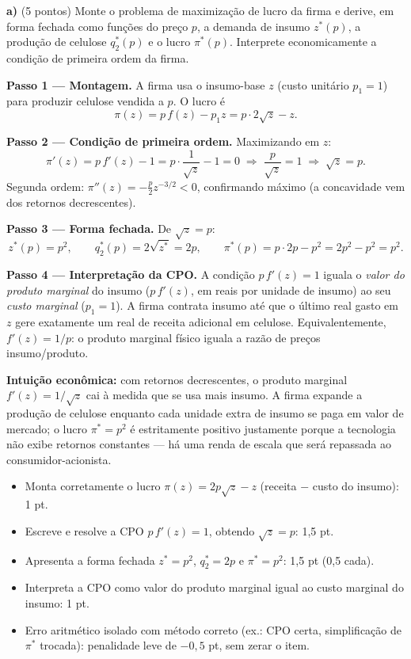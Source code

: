 \textbf{a)} (5 pontos) Monte o problema de maximização de lucro da firma e derive, em forma fechada como funções do preço $p$, a demanda de insumo $z^{*}(p)$, a produção de celulose $q_2^{*}(p)$ e o lucro $\pi^{*}(p)$. Interprete economicamente a condição de primeira ordem da firma.
\resolucaobox{7.2cm}
\begin{solucao}
\textbf{Passo 1 --- Montagem.} A firma usa o insumo-base $z$ (custo unitário $p_1=1$) para produzir celulose vendida a $p$. O lucro é
\[ \pi(z)=p\,f(z)-p_1 z = p\cdot 2\sqrt{z} - z. \]

\textbf{Passo 2 --- Condição de primeira ordem.} Maximizando em $z$:
\[ \pi'(z)=p\,f'(z)-1 = p\cdot\frac{1}{\sqrt{z}} - 1 = 0 \;\Longrightarrow\; \frac{p}{\sqrt{z}}=1 \;\Longrightarrow\; \sqrt{z}=p. \]
Segunda ordem: $\pi''(z)=-\tfrac{p}{2}z^{-3/2}<0$, confirmando máximo (a concavidade vem dos retornos decrescentes).

\textbf{Passo 3 --- Forma fechada.} De $\sqrt z = p$:
\[ z^{*}(p)=p^{2}, \qquad q_2^{*}(p)=2\sqrt{z^{*}}=2p, \qquad \pi^{*}(p)=p\cdot 2p - p^{2}=2p^{2}-p^{2}=p^{2}. \]

\textbf{Passo 4 --- Interpretação da CPO.} A condição $p\,f'(z)=1$ iguala o \emph{valor do produto marginal} do insumo ($p\,f'(z)$, em reais por unidade de insumo) ao seu \emph{custo marginal} ($p_1=1$). A firma contrata insumo até que o último real gasto em $z$ gere exatamente um real de receita adicional em celulose. Equivalentemente, $f'(z)=1/p$: o produto marginal físico iguala a razão de preços insumo/produto.

\textbf{Intuição econômica:} com retornos decrescentes, o produto marginal $f'(z)=1/\sqrt z$ cai à medida que se usa mais insumo. A firma expande a produção de celulose enquanto cada unidade extra de insumo se paga em valor de mercado; o lucro $\pi^{*}=p^{2}$ é estritamente positivo justamente porque a tecnologia não exibe retornos constantes --- há uma renda de escala que será repassada ao consumidor-acionista.
\rubricalabel
\begin{itemize}
\item Monta corretamente o lucro $\pi(z)=2p\sqrt z - z$ (receita $-$ custo do insumo): 1 pt.
\item Escreve e resolve a CPO $p\,f'(z)=1$, obtendo $\sqrt z = p$: 1{,}5 pt.
\item Apresenta a forma fechada $z^{*}=p^{2}$, $q_2^{*}=2p$ e $\pi^{*}=p^{2}$: 1{,}5 pt (0{,}5 cada).
\item Interpreta a CPO como valor do produto marginal igual ao custo marginal do insumo: 1 pt.
\item Erro aritmético isolado com método correto (ex.: CPO certa, simplificação de $\pi^{*}$ trocada): penalidade leve de $-0{,}5$ pt, sem zerar o item.
\end{itemize}
\end{solucao}


